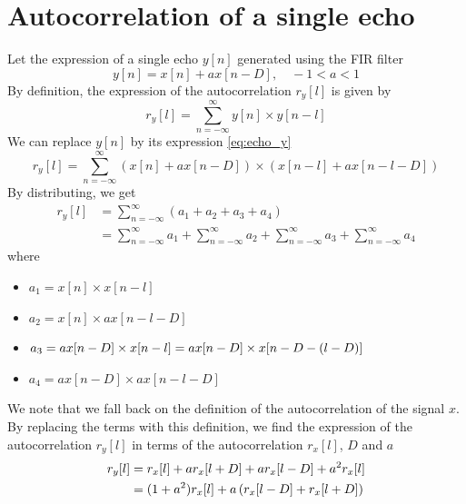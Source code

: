 \documentclass[a4paper, 12pt]{article}
\begin{document}
	\section{Autocorrelation of a single echo}
	Let the expression of a single echo $y[n]$ generated using the FIR filter
	\begin{equation}
	    \label{eq:echo_y}
	    \tag{$\dagger$}
	    y[n] = x[n] + ax[n-D],\quad -1<a<1
	\end{equation}
	By definition, the expression of the autocorrelation $r_y[l]$ is given by
	\begin{equation*}
	    r_y[l] = \sum_{n=-\infty}^{\infty}y[n]\times y[n-l]
	\end{equation*}
	We can replace $y[n]$ by its expression \eqref{eq:echo_y}
	\begin{equation*}
	    r_y[l] = \sum_{n=-\infty}^{\infty}(x[n]+ax[n-D])\times (x[n-l] + ax[n-l-D])
	\end{equation*}
	By distributing, we get
	\begin{align*}
	    r_y[l] &= \sum_{n=-\infty}^{\infty}(a_1+a_2+a_3+a_4)\\
	    &= \sum_{n=-\infty}^{\infty}a_1 + \sum_{n=-\infty}^{\infty}a_2 + \sum_{n=-\infty}^{\infty}a_3 + \sum_{n=-\infty}^{\infty}a_4
	\end{align*}
	where
	\begin{itemize}
	    \item $a_1 = x[n]\times x[n-l]$
	    \item $a_2 = x[n]\times ax[n-l-D]$
	    \item $a_3 = ax[n-D]\times x[n-l] = ax[n-D]\times x[n-D-\left(l-D\right)]$
	    \item $a_4 = ax[n-D]\times ax[n-l-D]$
	\end{itemize}
	We note that we fall back on the definition of the autocorrelation of the signal $x$. By replacing the terms with this definition, we find the expression of the autocorrelation $r_y[l]$ in terms of the autocorrelation $r_x[l]$, $D$ and $a$
	\begin{align*}
	    r_y[l] &= r_x[l] + ar_x[l+D] + ar_x[l-D] + a^2r_x[l]\\
	    &= (1+a^2)r_x[l] + a\left(r_x[l-D] + r_x[l+D]\right)
	\end{align*}
	\newpage
\end{document}
